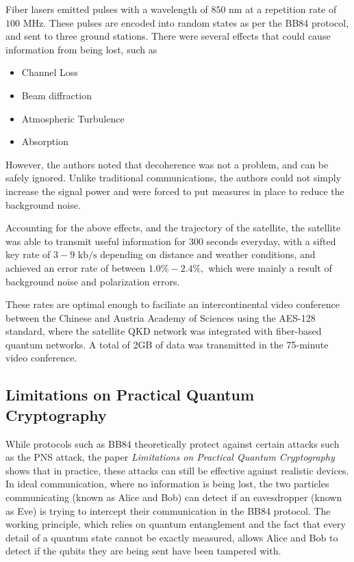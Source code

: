 \documentclass{article}
\numberwithin{equation}{section}
\begin{document}
Fiber lasers emitted pulses with a wavelength of $850\text{ nm}$ at a repetition rate of $100\text{ MHz}.$ These pulses are encoded into random states as per the BB84 protocol, and sent to three ground stations. There were several effects that could cause information from being lost, such as
\begin{itemize}
    \item Channel Loss
    \item Beam diffraction
    \item Atmospheric Turbulence
    \item Absorption
\end{itemize}
However, the authors noted that decoherence was not a problem, and can be safely ignored. Unlike traditional communications, the authors could not simply increase the signal power and were forced to put measures in place to reduce the background noise.

Accounting for the above effects, and the trajectory of the satellite, the satellite was able to transmit useful information for 300 seconds everyday, with a sifted key rate of $3-9\text{ kb/s}$ depending on distance and weather conditions, and achieved an error rate of between $1.0\%-2.4\%,$ which were mainly a result of background noise and polarization errors.

These rates are optimal enough to faciliate an intercontinental video conference between the Chinese and Austria Academy of Sciences using the AES-128 standard, where the satellite QKD network was integrated with fiber-based quantum networks. A total of 2GB of data was transmitted in the 75-minute video conference. 
\subsection{Limitations on Practical Quantum Cryptography}
While protocols such as BB84 theoretically protect against certain attacks such as the PNS attack, the paper \textit{Limitations on Practical Quantum Cryptography} shows that in practice, these attacks can still be effective against realistic devices\cite{Brassard2000}. In ideal communication, where no information is being lost, the two particles communicating (known as Alice and Bob) can detect if an eavesdropper (known as Eve) is trying to intercept their communication in the BB84 protocol. The working principle, which relies on quantum entanglement and the fact that every detail of a quantum state cannot be exactly measured, allows Alice and Bob to detect if the qubits they are being sent have been tampered with.
\end{document}

